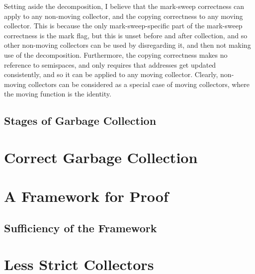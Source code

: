 Setting aside the decomposition, I believe that the mark-sweep
correctness can apply to any non-moving collector, and the copying
correctness to any moving collector. This is because the only
mark-sweep-specific part of the mark-sweep correctness is the mark
flag, but this is unset before and after collection, and so other
non-moving collectors can be used by disregarding it, and then not
making use of the decomposition. Furthermore, the copying correctness
makes no reference to semispaces, and only requires that addresses get
updated consistently, and so it can be applied to any moving
collector. Clearly, non-moving collectors can be considered as a
special case of moving collectors, where the moving function is the
identity.

\subsection{Stages of Garbage Collection}
\label{sec:gc-comparison-stages}


\section{Correct Garbage Collection}
\label{sec:gc-correct}


\section{A Framework for Proof}
\label{sec:gc-framework}


\subsection{Sufficiency of the Framework}
\label{sec:gc-framework-sufficiency}


\section{Less Strict Collectors}
\label{sec:gc-lessstrict}


